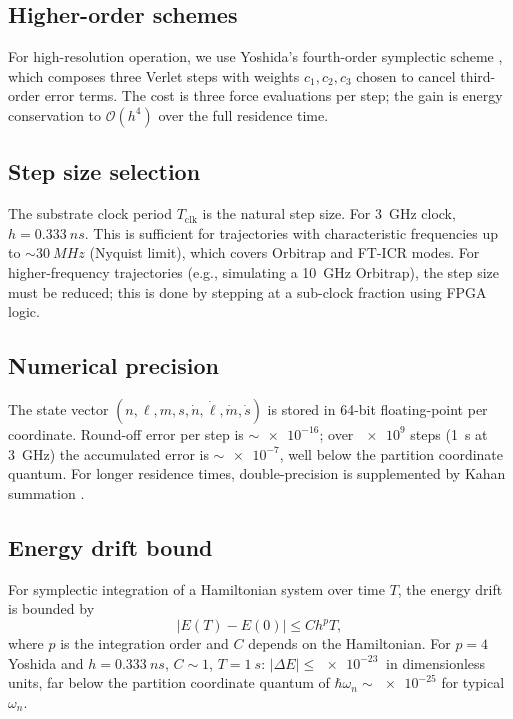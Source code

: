 \documentclass[twocolumn,11pt,a4paper]{article}
\theoremstyle{definition}
\theoremstyle{remark}
\begin{document}
\subsection{Higher-order schemes}

For high-resolution operation, we use Yoshida's fourth-order symplectic scheme \citep{yoshida1990}, which composes three Verlet steps with weights $c_1, c_2, c_3$ chosen to cancel third-order error terms. The cost is three force evaluations per step; the gain is energy conservation to $\mathcal{O}(h^4)$ over the full residence time.

\subsection{Step size selection}

The substrate clock period $T_{\mathrm{clk}}$ is the natural step size. For \SI{3}{GHz} clock, $h = \SI{0.333}{ns}$. This is sufficient for trajectories with characteristic frequencies up to $\sim\SI{30}{MHz}$ (Nyquist limit), which covers Orbitrap and FT-ICR modes. For higher-frequency trajectories (e.g., simulating a \SI{10}{GHz} Orbitrap), the step size must be reduced; this is done by stepping at a sub-clock fraction using FPGA logic.

\subsection{Numerical precision}

The state vector $(n, \ell, m, s, \dot{n}, \dot\ell, \dot m, \dot s)$ is stored in 64-bit floating-point per coordinate. Round-off error per step is $\sim\num{e-16}$; over $\num{e9}$ steps (\SI{1}{s} at \SI{3}{GHz}) the accumulated error is $\sim\num{e-7}$, well below the partition coordinate quantum. For longer residence times, double-precision is supplemented by Kahan summation \citep{kahan1965}.

\subsection{Energy drift bound}

For symplectic integration of a Hamiltonian system over time $T$, the energy drift is bounded by \citep{benettin1994,hairer2006}
\begin{equation}
    |E(T) - E(0)| \le C h^p T,
\end{equation}
where $p$ is the integration order and $C$ depends on the Hamiltonian. For $p = 4$ Yoshida and $h = \SI{0.333}{ns}$, $C \sim 1$, $T = \SI{1}{s}$: $|\Delta E| \le \SI{e-23}{}$ in dimensionless units, far below the partition coordinate quantum of $\hbar\omega_n \sim \num{e-25}$ for typical $\omega_n$.
\end{document}
